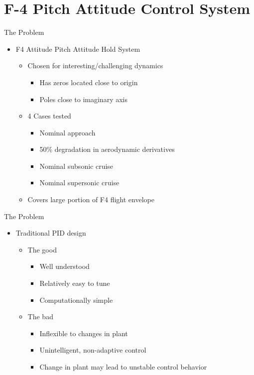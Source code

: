 \documentclass[]{beamer}
\begin{document}
\section{F-4 Pitch Attitude Control System}
\begin{frame}{The Problem}
\begin{itemize}
\item F4 Attitude Pitch Attitude Hold System
    \begin{itemize}
    \item Chosen for interesting/challenging dynamics
        \begin{itemize}
        \item Has zeros located close to origin
        \item Poles close to imaginary axis
        \end{itemize}
    \item 4 Cases tested
        \begin{itemize}
        \item Nominal approach
        \item 50\% degradation in aerodynamic derivatives
        \item Nominal subsonic cruise
        \item Nominal supersonic cruise
        \end{itemize}
    \item Covers large portion of F4 flight envelope
    \end{itemize}
\end{itemize}
\end{frame}


\begin{frame}{The Problem}
\begin{itemize}
\item Traditional PID design
    \begin{itemize}
    \item The good
        \begin{itemize}
        \item Well understood
        \item Relatively easy to tune
        \item Computationally simple
        \end{itemize}
    \item The bad
        \begin{itemize}
        \item Inflexible to changes in plant
        \item Unintelligent, non-adaptive control
        \item Change in plant may lead to unstable control behavior
        \end{itemize}
    \end{itemize}
\end{itemize}
\end{frame}
\end{document}
